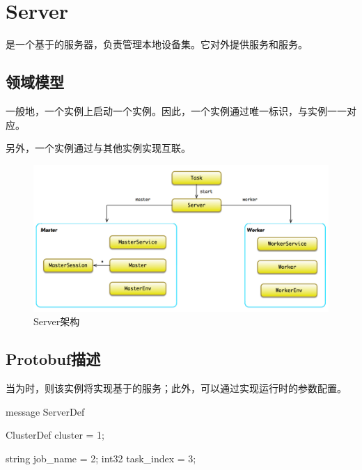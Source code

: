 \section{Server}

\begin{content}

是一个基于的服务器，负责管理本地设备集。它对外提供服务和服务。

\subsection{领域模型}

一般地，一个实例上启动一个实例。因此，一个实例通过唯一标识，与实例一一对应。

另外，一个实例通过与其他实例实现互联。

\begin{figure}[!h]
\centering
\includegraphics[width=1.0\textwidth]{figures/cc-server-model.png}
\caption{Server架构}
 \label{fig:cc-server-model}
\end{figure}

\subsection{Protobuf描述}

当为时，则该实例将实现基于的服务；此外，可以通过实现运行时的参数配置。

\begin{leftbar}
\begin{python}
message ServerDef {
  ClusterDef cluster = 1;
  
  string job_name = 2;
  int32 task_index = 3;

}
\end{python}
\end{leftbar}
\end{content}
